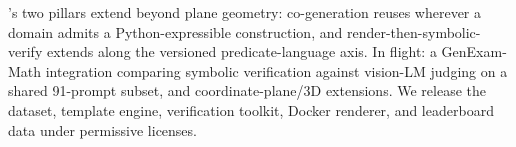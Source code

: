 \documentclass{article}
\begin{document}
\GeoGen's two pillars extend beyond plane geometry: co-generation reuses wherever a domain admits a Python-expressible construction, and render-then-symbolic-verify extends along the versioned predicate-language axis.
In flight: a GenExam-Math integration \citep{wang2025genexam} comparing symbolic verification against vision-LM judging on a shared 91-prompt subset, and coordinate-plane/3D extensions.
We release the dataset, template engine, verification toolkit, Docker renderer, and leaderboard data under permissive licenses.



\end{document}
